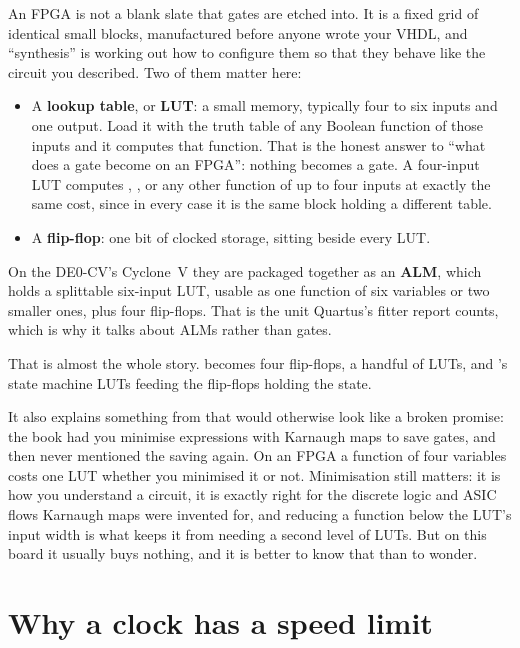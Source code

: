 An FPGA is not a blank slate that gates are etched into. It is a fixed grid of identical small
blocks, manufactured before anyone wrote your VHDL, and ``synthesis'' is working out how to
configure them so that they behave like the circuit you described. Two of them matter here:
\begin{itemize}
  \item A \textbf{lookup table}, or \textbf{LUT}: a small memory, typically four to six inputs and
    one output. Load it with the truth table of any Boolean function of those inputs and it
    computes that function. That is the honest answer to ``what does a gate become on an FPGA'':
    nothing becomes a gate. A four-input LUT computes ,
    , or any other function of up to four inputs at exactly the same
    cost, since in every case it is the same block holding a different table.
  \item A \textbf{flip-flop}: one bit of clocked storage, sitting beside every LUT.
\end{itemize}

On the DE0-CV's Cyclone~V they are packaged together as an \textbf{ALM}, which holds a splittable
six-input LUT, usable as one function of six variables or two smaller ones, plus four flip-flops.
That is the unit Quartus's fitter report counts, which is why it talks about ALMs rather than
gates.

That is almost the whole story.  becomes four flip-flops,  a handful
of LUTs, and 's state machine LUTs feeding the flip-flops holding the state.

It also explains something from  that would otherwise look like a broken promise:
the book had you minimise expressions with Karnaugh maps to save gates, and then never mentioned the
saving again. On an FPGA a function of four variables costs one LUT whether you minimised it or not.
Minimisation still matters: it is how you understand a circuit, it is exactly right for the discrete
logic and ASIC flows Karnaugh maps were invented for, and reducing a function below the LUT's input
width is what keeps it from needing a second level of LUTs. But on this board it usually buys
nothing, and it is better to know that than to wonder.

\section{Why a clock has a speed limit}
\label{c5:sec:fmax}


